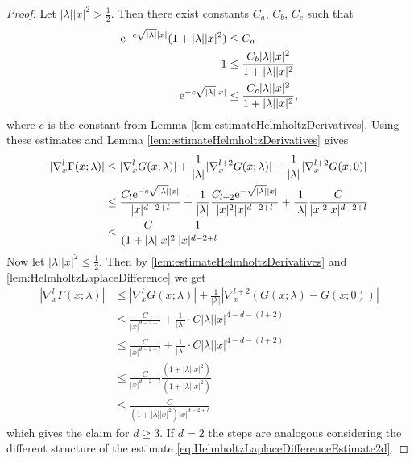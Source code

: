   \begin{proof}
    Let $|\lambda| |x|^2 > \frac{1}{2}$. 
    Then there exist constants $C_a$, $C_b$, $C_c$ such that
    \begin{align*}
      \mathrm{e}^{-c \sqrt{|\lambda|} |x|} ( 1 + |\lambda| |x|^2) &\leq C_a \\
      1 &\leq \frac{C_b |\lambda| |x|^2}{1 + |\lambda| |x|^2} \\
      \mathrm{e}^{-c \sqrt{|\lambda|} |x|} &\leq \frac{ C_c |\lambda| |x|^2}{1 + |\lambda| |x|^2},
    \end{align*}
    where $c$ is the constant from Lemma \ref{lem:estimateHelmholtzDerivatives}.
    Using these estimates and Lemma \ref{lem:estimateHelmholtzDerivatives} gives
    \begin{align*}
      |\nabla_x^l \Gamma(x; \lambda) |
      &\leq |\nabla_x^l G(x; \lambda)| + \frac{1}{|\lambda|} |\nabla_x^{l + 2} G(x; \lambda) | + \frac{1}{|\lambda|} |\nabla_x^{l + 2} G(x; 0)| \\
    &\leq\frac{C_l \mathrm{e}^{-c \sqrt{|\lambda|} |x|}}{|x|^{d - 2 + l}} + \frac{1}{|\lambda|} \frac{C_{l + 2} \mathrm{e}^{-\sqrt{|\lambda|} |x|}}{|x|^2 |x|^{d - 2 + l}} + \frac{1}{|\lambda|} \frac{C}{|x|^2 |x|^{d - 2 + l}} \\
    &\leq \frac{C}{(1 + |\lambda| |x|^2} \frac{1}{|x|^{d - 2 + l}}
    \end{align*}
    Now let $|\lambda| |x|^2 \leq \frac{1}{2}$.
    Then by \ref{lem:estimateHelmholtzDerivatives} and \ref{lem:HelmholtzLaplaceDifference} we get
    \begin{align*}
      |\nabla_x^l \Gamma(x; \lambda) |
      &\leq |\nabla_x^l G(x; \lambda) | + \frac{1}{|\lambda|} |\nabla_x^{l + 2} ( G(x; \lambda) - G(x; 0))| \\
      &\leq \frac{C}{|x|^{d - 2 + l}} + \frac{1}{|\lambda|} \cdot C |\lambda| |x|^{4 - d - (l + 2)} \\
      &\leq \frac{C}{|x|^{d - 2 + l}} + \frac{1}{|\lambda|} \cdot C |\lambda| |x|^{4 - d - (l + 2)} \\
      &\leq \frac{C}{|x|^{d - 2 + l}} \frac{(1 + |\lambda| |x|^2)}{(1 + |\lambda| |x|^2)} \\
      &\leq \frac{C}{(1 + |\lambda| |x|^2) |x|^{d - 2 + l}}
    \end{align*}
    which gives the claim for $d \geq 3$.
    If $d = 2$ the steps are analogous considering the different structure of the estimate \eqref{eq:HelmholtzLaplaceDifferenceEstimate2d}.
  \end{proof}

